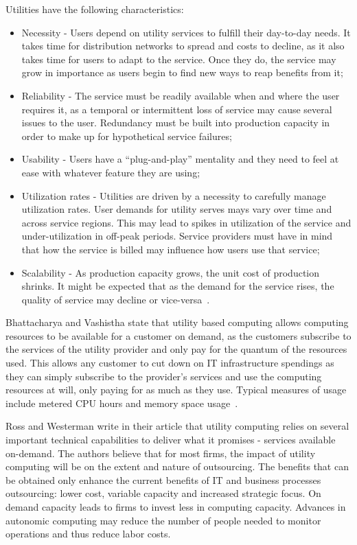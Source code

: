 Utilities have the following characteristics:
\begin{itemize}
\item Necessity - Users depend on utility services to fulfill their day-to-day needs. It takes time for distribution networks to spread and costs to decline, as it also takes time for users to adapt to the service. Once they do, the service may grow in importance as users begin to find new ways to reap benefits from it;
\item Reliability - The service must be readily available when and where the user requires it, as a temporal or intermittent loss of service may cause several issues to the user. Redundancy must be built into production capacity in order to make up for hypothetical service failures;
\item Usability - Users have a ``plug-and-play'' mentality and they need to feel at ease with whatever feature they are using;
\item Utilization rates - Utilities are driven by a necessity to carefully manage utilization rates. User demands for utility serves mays vary over time and across service regions. This may lead to spikes in utilization of the service and under-utilization in off-peak periods. Service providers must have in mind that how the service is billed may influence how users use that service;
\item Scalability - As production capacity grows, the unit cost of production shrinks. It might be expected that as the demand for the service rises, the quality of service may decline or vice-versa~\cite{ibm-utility}.
\end{itemize}

Bhattacharya and Vashistha state that utility based computing allows computing resources to be available for a customer on demand, as the customers subscribe to the services of the utility provider and only pay for the quantum of the resources used. This allows any customer to cut down on IT infrastructure spendings as they can simply subscribe to the provider's services and use the computing resources at will, only paying for as much as they use. Typical measures of usage include metered CPU hours and memory space usage~\cite{bhatta-utility}.

Ross and Westerman write in their article that utility computing relies on several important technical capabilities to deliver what it promises - services available on-demand. The authors believe that for most firms, the impact of utility computing will be on the extent and nature of outsourcing. The benefits that can be obtained only enhance the current benefits of IT and business processes outsourcing: lower cost, variable capacity and increased strategic focus. On demand capacity leads to firms to invest less in computing capacity. Advances in autonomic computing may reduce the number of people needed to monitor operations and thus reduce labor costs.


